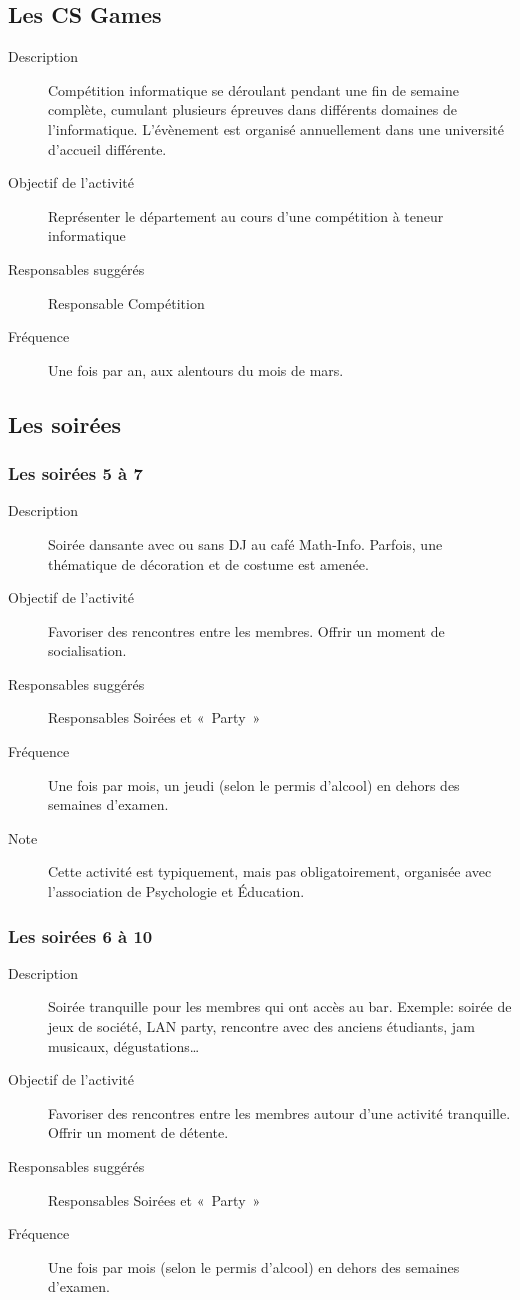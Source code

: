 \documentclass{aediroum}
\begin{document}
\subsection{Les CS Games}
\begin{description}
	\item[Description] Compétition informatique se déroulant pendant une fin de semaine complète, cumulant plusieurs épreuves dans différents domaines de l'informatique. L'évènement est organisé annuellement dans une université d'accueil différente.
	\item[Objectif de l'activité] Représenter le département au cours d'une compétition à teneur informatique
	\item[Responsables suggérés] Responsable Compétition
	\item[Fréquence] Une fois par an, aux alentours du mois de mars.
\end{description}

\subsection{Les soirées}
\subsubsection{Les soirées 5 à 7}
\begin{description}
	\item[Description] Soirée dansante avec ou sans DJ au café Math-Info. Parfois, une thématique de décoration et de costume est amenée.
	\item[Objectif de l'activité] Favoriser des rencontres entre les membres. Offrir un moment de socialisation.
	\item[Responsables suggérés] Responsables Soirées et «~Party~»
	\item[Fréquence] Une fois par mois, un jeudi (selon le permis d'alcool) en dehors des semaines d'examen.
	\item[Note] Cette activité est typiquement, mais pas obligatoirement, organisée avec l'association de Psychologie et Éducation.
\end{description}

\subsubsection{Les soirées 6 à 10}
\begin{description}
	\item[Description] Soirée tranquille pour les membres qui ont accès au bar. Exemple: soirée de jeux de société, LAN party, rencontre avec des anciens étudiants, jam musicaux, dégustations\ldots{}
	\item[Objectif de l'activité] Favoriser des rencontres entre les membres autour d'une activité tranquille. Offrir un moment de détente.
	\item[Responsables suggérés] Responsables Soirées et «~Party~»
	\item[Fréquence] Une fois par mois (selon le permis d'alcool) en dehors des semaines d'examen.
\end{description}
\end{document}
